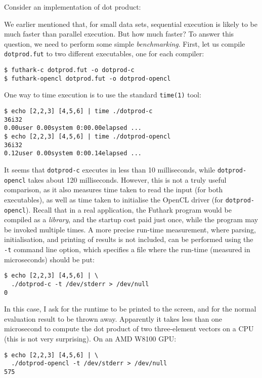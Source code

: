 \documentclass[11pt]{book}
\begin{document}
Consider an implementation of dot product:



We earlier mentioned that, for small data sets, sequential execution
is likely to be much faster than parallel execution.  But how much
faster?  To answer this question, we need to perform some simple
\textit{benchmarking}.  First, let us compile \texttt{dotprod.fut} to
two different executables, one for each compiler:

\begin{verbatim}
$ futhark-c dotprod.fut -o dotprod-c
$ futhark-opencl dotprod.fut -o dotprod-opencl
\end{verbatim}

One way to time execution is to use the standard \texttt{time(1)}
tool:

\begin{verbatim}
$ echo [2,2,3] [4,5,6] | time ./dotprod-c
36i32
0.00user 0.00system 0:00.00elapsed ...
$ echo [2,2,3] [4,5,6] | time ./dotprod-opencl
36i32
0.12user 0.00system 0:00.14elapsed ...
\end{verbatim}

It seems that \texttt{dotprod-c} executes in less than 10
milliseconds, while \texttt{dotprod-opencl} takes about 120
milliseconds.  However, this is not a truly useful comparison, as it
also measures time taken to read the input (for both executables), as
well as time taken to initialise the OpenCL driver (for
\texttt{dotprod-opencl}).  Recall that in a real application, the
Futhark program would be compiled as a \textit{library}, and the
startup cost paid just once, while the program may be invoked multiple
times.  A more precise run-time measurement, where parsing,
initialisation, and printing of results is not included, can be
performed using the \texttt{-t} command line option, which specifies a
file where the run-time (measured in microseconds) should be put:

\begin{verbatim}
$ echo [2,2,3] [4,5,6] | \
  ./dotprod-c -t /dev/stderr > /dev/null
0
\end{verbatim}

In this case, I ask for the runtime to be printed to the screen, and
for the normal evaluation result to be thrown away.  Apparently it
takes less than one microsecond to compute the dot product of two
three-element vectors on a CPU (this is not very surprising).  On an
AMD W8100 GPU:

\begin{verbatim}
$ echo [2,2,3] [4,5,6] | \
  ./dotprod-opencl -t /dev/stderr > /dev/null
575
\end{verbatim}
\end{document}
